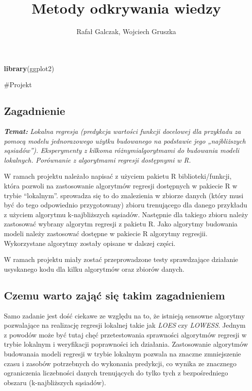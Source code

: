 \documentclass[
]{article}
\title{Metody odkrywania wiedzy}
\author{Rafał Galczak, Wojciech Gruszka}
\date{}
\newenvironment{Shaded}{\begin{snugshade}}{\end{snugshade}}
\newcommand{\KeywordTok}[1]{\textcolor[rgb]{0.13,0.29,0.53}{\textbf{#1}}}
\newcommand{\NormalTok}[1]{#1}
\begin{document}
\maketitle

\begin{Shaded}
\begin{Highlighting}[]
\KeywordTok{library}\NormalTok{(ggplot2)}
\end{Highlighting}
\end{Shaded}

\#Projekt

\hypertarget{zagadnienie}{%
\subsection{Zagadnienie}\label{zagadnienie}}

\textbf{\emph{Temat:}} \emph{Lokalna regresja (predykcja wartości
funkcji docelowej dla przykładu za pomocą modelu jednorazowego użytku
budowanego na podstawie jego „najbliższych sąsiadów''). Eksperymenty z
kilkoma różnymialgorytmami do budowania modeli lokalnych. Porównanie z
algorytmami regresji dostępnymi w R.}

W ramach projektu należało napisać z użyciem pakietu R
biblioteki/funkcji, która pozwoli na zastosowanie algorytmów regresji
dostępnych w pakiecie R w trybie ``lokalnym''. sprowadza się to do
znalezienia w zbiorze danych (który musi być do tego odpowiednio
przygotowany) zbioru trenującego dla danego przykładu z użyciem
algorytmu k-najbliższych sąsiadów. Następnie dla takiego zbioru należy
zastosować wybrany algorytm regresji z pakietu R. Jako algorytmy
budowania modeli należy zastosować dostępne w pakiecie R algorytmy
regresjii. Wykorzystane algorytmy zostały opisane w dalszej części.

W ramach projektu miały zostać przeprowadzone testy sprawdzające
działanie usyskanego kodu dla kilku algorytmów oraz zbiorów danych.

\hypertarget{czemu-warto-zajux105ux107-siux119-takim-zagadnieniem}{%
\subsection{Czemu warto zająć się takim
zagadnieniem}\label{czemu-warto-zajux105ux107-siux119-takim-zagadnieniem}}

Samo zadanie jest dość ciekawe ze względu na to, że istnieją sensowne
algorytmy pozwalające na realizację regresji lokalnej takie jak
\emph{LOES} czy \emph{LOWESS}. Jednym z powodów może być tutaj chęć
przetestowania sprawności algorytmów regresji w trybie lokalnym i
weryfikacji poprawności ich działania. Zastosowanie algorytmów
budowanaia modeli regresji w trybie lokalnym pozwala na znaczne
zmniejszenie czasu i zasobów potrzebnych do wykonania predykcji, co
wynika ze znacznego ograniczenia liczebności danych trenujących do tylko
tych z bezpośredniego obszaru (k-najbliższych sąsiadów).
\end{document}
